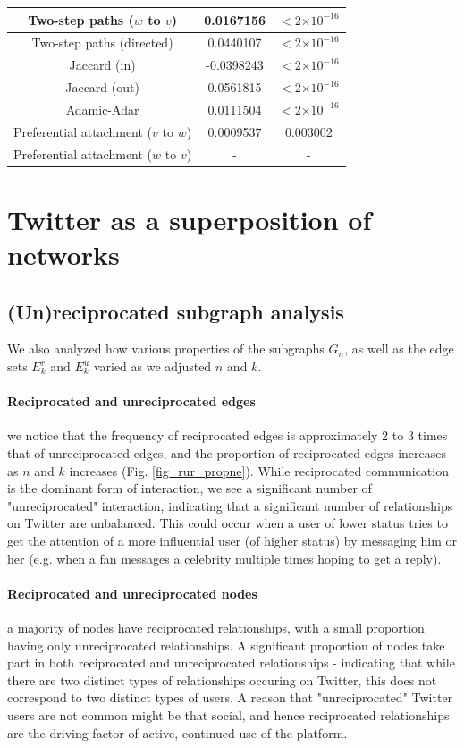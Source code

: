 \documentclass[conference]{IEEEtran}
\providecommand{\e}[1]{\ensuremath{\times 10^{#1}}}
\begin{document}
\begin{table}[!t]
\begin{tabular}{|c||c|c|}
Two-step paths ($w$ to $v$)   &    0.0167156  & $< 2 \e{-16} $\\
\hline
Two-step paths (directed)  &   0.0440107 & $< 2 \e{-16} $\\
Jaccard (in) & -0.0398243 & $< 2 \e{-16} $\\
Jaccard (out) &   0.0561815  & $< 2 \e{-16} $\\
Adamic-Adar  & 0.0111504 & $< 2 \e{-16} $ \\
Preferential attachment ($v$ to $w$) & 0.0009537 & 0.003002 \\
Preferential attachment ($w$ to $v$)  &  - & -  \\
\hline
\end{tabular}
\end{table}

\section{Twitter as a superposition of networks}

\subsection{(Un)reciprocated subgraph analysis}
We also analyzed how various properties of the subgraphs $G_n$, as well as the edge sets $E^r_k$ and $E^u_k$ varied as we adjusted $n$ and $k$.

\paragraph{Reciprocated and unreciprocated edges} we notice that the frequency of reciprocated edges is approximately 2 to 3 times that of unreciprocated edges, and the proportion of reciprocated edges increases as $n$ and $k$ increases (Fig. \ref{fig_rur_propne}). While reciprocated communication is the dominant form of interaction, we see a significant number of "unreciprocated" interaction, indicating that a significant number of relationships on Twitter are unbalanced. This could occur when a user of lower status tries to get the attention of a more influential user (of higher status) by messaging him or her (e.g. when a fan messages a celebrity multiple times hoping to get a reply). 

\paragraph{Reciprocated and unreciprocated nodes} a majority of nodes have reciprocated relationships, with a small proportion having only unreciprocated relationships. A significant proportion of nodes take part in both reciprocated and unreciprocated relationships - indicating that while there are two distinct types of relationships occuring on Twitter, this does not correspond to two distinct types of users. A reason that "unreciprocated" Twitter users are not common might be that social, and hence reciprocated relationships are the driving factor of active, continued use of the platform. 
\end{document}

